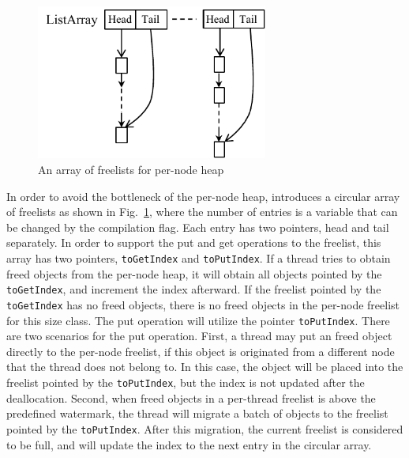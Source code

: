\begin{figure}
\centering
\includegraphics[width=3in]{figure/listarray}
\vspace{-0.1in}
\caption{An array of freelists for per-node heap\label{fig:listarray}}
\vspace{-0.2in}
\end{figure}
In order to avoid the bottleneck of the per-node heap, \NM{} introduces a circular array of freelists as shown in Fig.~\ref{fig:listarray}, where the number of entries is a variable that can be changed by the compilation flag. Each entry has two pointers, head and tail separately. In order to support the put and get operations to the freelist, this array has two pointers, \texttt{toGetIndex} and  \texttt{toPutIndex}. If a thread tries to obtain freed objects from the per-node heap, it will obtain all  objects pointed by the \texttt{toGetIndex}, and increment the index afterward. If the freelist pointed by the \texttt{toGetIndex} has no freed objects, there is no freed objects in the per-node freelist for this size class.  The put operation will utilize the pointer \texttt{toPutIndex}. There are two scenarios for the put operation. First, a thread may put an freed object directly to the per-node freelist, if this object is originated from a different node that the thread does not belong to. In this case, the object will be placed into the freelist pointed by the \texttt{toPutIndex}, but the index is not updated after the deallocation. Second, when freed objects in a per-thread freelist is above the predefined watermark, the thread will migrate a batch of objects to the freelist pointed by the \texttt{toPutIndex}. After this migration, the current freelist is considered to be full, and will update the index to the next entry in the circular array.

   

 



